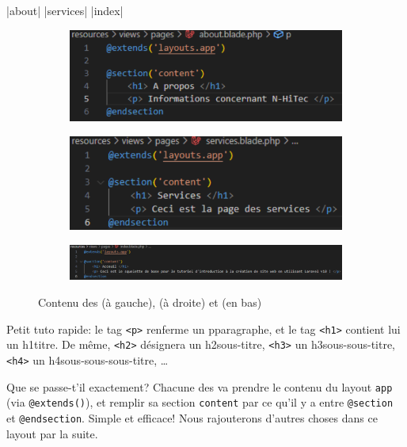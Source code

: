\vspace{2cm}
|about|
|services|
|index|
\begin{figure}[!h]
    \centering
    \begin{subfigure}[b]{0.49\textwidth}
         \centering
         \includegraphics[width=\textwidth]{figures-C1/basic_about.pdf}
     \end{subfigure}
     \begin{subfigure}[b]{0.49\textwidth}
         \centering
         \includegraphics[width=\textwidth]{figures-C1/basic_services.pdf}
     \end{subfigure}
     \begin{subfigure}[b]{1\textwidth}
         \centering
         \includegraphics[width=\textwidth]{figures-C1/basic_acceuil.pdf}
     \end{subfigure}
        \caption{Contenu des \views{} \protect{} (à gauche), \protect{} (à droite) et \protect{} (en bas)}
\end{figure}
Petit tuto \html{} rapide: le tag \verb|<p>| renferme un pparagraphe, et le tag \verb|<h1>| contient lui un h1titre. De même, \verb|<h2>| désignera un h2sous-titre, \verb|<h3>| un h3sous-sous-titre, \verb|<h4>| un h4sous-sous-sous-titre, \ldots

Que se passe-t'il exactement? Chacune des \views{} va prendre le contenu du layout \verb|app| (via \verb|@extends()|), et remplir sa section \verb|content| par ce qu'il y a entre \verb|@section| et \verb|@endsection|. Simple et efficace! Nous rajouterons d'autres choses dans ce layout par la suite.

